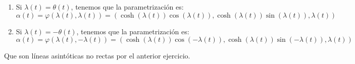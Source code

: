 \begin{enumerate}
    \item Si $\lambda\left( t \right) = \theta\left( t \right)$, tenemos que la
        parametrización es:
    \[
        \alpha\left( t \right) = \varphi\left( \lambda\left( t \right),
        \lambda\left( t \right) \right) = \boxed{\left( \cosh\left(
            \lambda\left( t \right) \right)\cos \left( \lambda\left( t \right)
        \right), \cosh\left( \lambda\left( t \right) \right)\sin \left(
        \lambda\left( t \right) \right), \lambda\left( t \right) \right)}
    \]
    \item Si $\lambda\left( t \right) = -\theta\left( t \right)$, tenemos que la
        parametrización es:
    \[
        \alpha\left( t \right) = \varphi\left( \lambda\left( t \right),
        -\lambda\left( t \right) \right) = \boxed{\left( \cosh\left(
        \lambda\left( t \right) \right)\cos \left( -\lambda\left( t \right)
        \right), \cosh\left( \lambda\left( t \right) \right)\sin \left(
        -\lambda\left( t \right) \right), \lambda\left( t \right) \right)}
    \]
\end{enumerate}
Que son líneas asintóticas no rectas por el anterior ejercicio.
